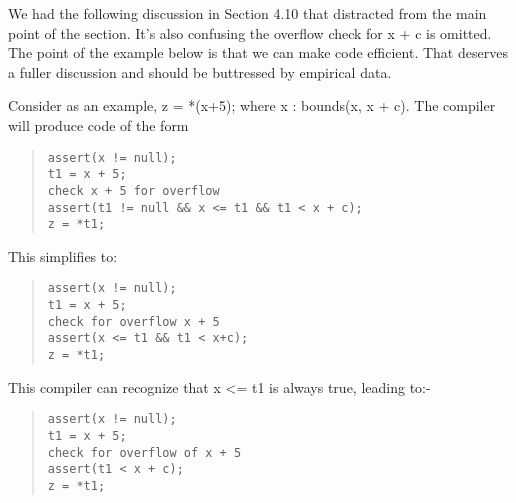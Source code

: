We had the following discussion in Section 4.10 that distracted from the
main point of the section. It's also confusing the overflow check for x
+ c is omitted. The point of the example below is that we can make code
efficient. That deserves a fuller discussion and should be buttressed by
empirical data.

Consider as an example, z = *(x+5); where x : bounds(x, x + c). The
compiler will produce code of the form

\begin{quote}
\begin{verbatim}
assert(x != null);
t1 = x + 5;
check x + 5 for overflow
assert(t1 != null && x <= t1 && t1 < x + c);
z = *t1;
\end{verbatim}
\end{quote}

This simplifies to:

\begin{quote}
\begin{verbatim}
assert(x != null);
t1 = x + 5;
check for overflow x + 5
assert(x <= t1 && t1 < x+c);
z = *t1;
\end{verbatim}
\end{quote}

This compiler can recognize that x \textless{}= t1 is always true,
leading to:-

\begin{quote}
\begin{verbatim}
assert(x != null);
t1 = x + 5;
check for overflow of x + 5
assert(t1 < x + c);
z = *t1;
\end{verbatim}
\end{quote}